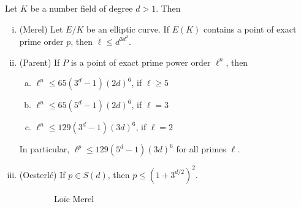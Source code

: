 
\begin{frame}[plain]
\begin{thm}
Let $K$ be a number field of degree $d > 1$. Then
	\begin{enumerate}[(i)]
	\item (Merel) Let $E/K$ be an elliptic curve. If $E(K)$ contains a point of exact prime order $p$, then $\ell \leq d^{3d^2}$.
	\item (Parent) If $P$ is a point of exact prime power order $\ell^n$, then
		\begin{enumerate}[(a)]
		\item $\ell^n \leq 65(3^d - 1)(2d)^6$, if $\ell \geq 5$
		\item $\ell^n \leq 65(5^d - 1)(2d)^6$, if $\ell= 3$
		\item $\ell^n \leq 129(3^d - 1)(3d)^6$, if $\ell= 2$
		\end{enumerate}
	In particular, $\ell^p \leq 129(5^d - 1)(3d)^6$ for all primes $\ell$. 
	\item (Oesterl\'e) If $p \in S(d)$, then $p \leq (1 + 3^{d/2})^2$. 
	\end{enumerate}
\end{thm}
	\begin{figure}[h]
	\centering
	\begin{subfigure}{0.3\textwidth}
	\captionsetup{labelformat=empty}
	\centering
	\caption{Lo\"ic Merel}
	\end{subfigure}
	\begin{subfigure}{0.3\textwidth}

\end{subfigure}
\end{figure}
\end{frame}

